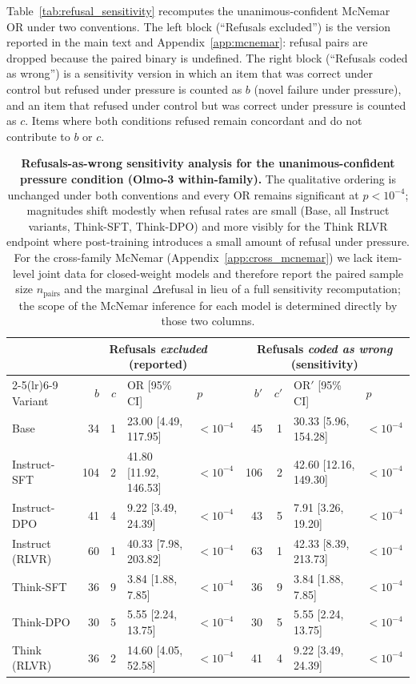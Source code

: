 \documentclass[11pt]{article}
\begin{document}
Table~\ref{tab:refusal_sensitivity} recomputes the unanimous-confident McNemar OR under two conventions. The left block (``Refusals excluded'') is the version reported in the main text and Appendix~\ref{app:mcnemar}: refusal pairs are dropped because the paired binary is undefined. The right block (``Refusals coded as wrong'') is a sensitivity version in which an item that was correct under control but refused under pressure is counted as $b$ (novel failure under pressure), and an item that refused under control but was correct under pressure is counted as $c$. Items where both conditions refused remain concordant and do not contribute to $b$ or $c$.

\begin{table}[H]
    \centering
    \footnotesize
    \setlength{\tabcolsep}{4pt}
    \renewcommand{\arraystretch}{1.0}
    \begin{tabular}{l rr ll rr ll}
        \toprule
         & \multicolumn{4}{c}{Refusals \emph{excluded} (reported)} & \multicolumn{4}{c}{Refusals \emph{coded as wrong} (sensitivity)} \\
        \cmidrule(lr){2-5}\cmidrule(lr){6-9}
        Variant & $b$ & $c$ & OR [95\% CI] & $p$ & $b'$ & $c'$ & OR$'$ [95\% CI] & $p$ \\
        \midrule
        Base & 34 & 1 & 23.00 [4.49, 117.95] & $<10^{-4}$ & 45 & 1 & 30.33 [5.96, 154.28] & $<10^{-4}$ \\
        Instruct-SFT & 104 & 2 & 41.80 [11.92, 146.53] & $<10^{-4}$ & 106 & 2 & 42.60 [12.16, 149.30] & $<10^{-4}$ \\
        Instruct-DPO & 41 & 4 & 9.22 [3.49, 24.39] & $<10^{-4}$ & 43 & 5 & 7.91 [3.26, 19.20] & $<10^{-4}$ \\
        Instruct (RLVR) & 60 & 1 & 40.33 [7.98, 203.82] & $<10^{-4}$ & 63 & 1 & 42.33 [8.39, 213.73] & $<10^{-4}$ \\
        Think-SFT & 36 & 9 & 3.84 [1.88, 7.85] & $<10^{-4}$ & 36 & 9 & 3.84 [1.88, 7.85] & $<10^{-4}$ \\
        Think-DPO & 30 & 5 & 5.55 [2.24, 13.75] & $<10^{-4}$ & 30 & 5 & 5.55 [2.24, 13.75] & $<10^{-4}$ \\
        Think (RLVR) & 36 & 2 & 14.60 [4.05, 52.58] & $<10^{-4}$ & 41 & 4 & 9.22 [3.49, 24.39] & $<10^{-4}$ \\
        \bottomrule
    \end{tabular}
    \caption{\textbf{Refusals-as-wrong sensitivity analysis for the unanimous-confident pressure condition (Olmo-3 within-family).} The qualitative ordering is unchanged under both conventions and every OR remains significant at $p < 10^{-4}$; magnitudes shift modestly when refusal rates are small (Base, all Instruct variants, Think-SFT, Think-DPO) and more visibly for the Think RLVR endpoint where post-training introduces a small amount of refusal under pressure. For the cross-family McNemar (Appendix~\ref{app:cross_mcnemar}) we lack item-level joint data for closed-weight models and therefore report the paired sample size $n_{\text{pairs}}$ and the marginal $\Delta$refusal in lieu of a full sensitivity recomputation; the scope of the McNemar inference for each model is determined directly by those two columns.}

\end{table}
\end{document}
